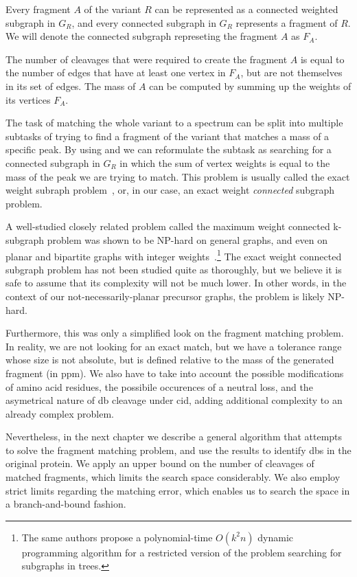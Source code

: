 \begin{lemma}\label{lemma:fragment}
  Every fragment \(A\) of the variant \(R\) can be represented as a connected weighted subgraph in \(G_R\), and every connected subgraph in \(G_R\) represents a fragment of \(R\). We will denote the connected subgraph represeting the fragment \(A\) as \(F_A\).
\end{lemma}

\begin{lemma}\label{lemma:mass}
  The number of cleavages that were required to create the fragment \(A\) is equal to the number of edges that have at least one vertex in \(F_A\), but are not themselves in its set of edges. The mass of \(A\) can be computed by summing up the weights of its vertices \(F_A\).
\end{lemma}

The task of matching the whole variant to a spectrum can be split into multiple subtasks of trying to find a fragment of the variant that matches a mass of a specific peak. By using  and  we can reformulate the subtask as searching for a connected subgraph in \(G_R\) in which the sum of vertex weights is equal to the mass of the peak we are trying to match. This problem is usually called the exact weight subraph problem~\cite{abboud2013exact}, or, in our case, an exact weight \emph{connected} subgraph problem.

A well-studied closely related problem called the maximum weight connected k-subgraph problem was shown to be NP-hard on general graphs, and even on planar and bipartite graphs with integer weights~\cite{hochbaum1994node}.\footnote{The same authors propose a polynomial-time \(O(k^2n)\) dynamic programming algorithm for a restricted version of the problem searching for subgraphs in trees.} The exact weight connected subgraph problem has not been studied quite as thoroughly, but we believe it is safe to assume that its complexity will not be much lower. In other words, in the context of our not-necessarily-planar precursor graphs, the problem is likely NP-hard.

Furthermore, this was only a simplified look on the fragment matching problem. In reality, we are not looking for an exact match, but we have a tolerance range whose size is not absolute, but is defined relative to the mass of the generated fragment (in ppm). We also have to take into account the possible modifications of amino acid residues, the possibile occurences of a neutral loss, and the asymetrical nature of \gls*{db} cleavage under \gls*{cid}, adding additional complexity to an already complex problem.

Nevertheless, in the next chapter we describe a general algorithm that attempts to solve the fragment matching problem, and use the results to identify \glspl*{db} in the original protein. We apply an upper bound on the number of cleavages of matched fragments, which limits the search space considerably. We also employ strict limits regarding the matching error, which enables us to search the space in a branch-and-bound fashion.